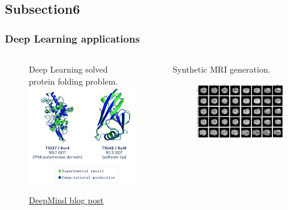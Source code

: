 \documentclass[10pt, xcolor=x11names,compress]{beamer}
\begin{document}
\subsection{Subsection6}
\begin{frame}\frametitle{Deep Learning applications}
	\begin{columns}
		\begin{column}{0.5\textwidth}
			\begin{figure}
				Deep Learning solved protein folding problem.
				\centering
				\includegraphics[height=.5\textheight]{images/deep_mind.png}
				\caption{\href{https://deepmind.com/blog/article/alphafold-a-solution-to-a-50-year-old-grand-challenge-in-biology}{{\color{blue}\underline{DeepMind blog post}}}}
			\end{figure}
		\end{column}
		\begin{column}{0.5\textwidth}
			Synthetic MRI generation.
			\begin{figure}
				\centering
				\includegraphics[height=.4\textheight]{images/mri_generation.png}

\end{figure}
\end{column}
\end{columns}
\end{frame}
\end{document}
